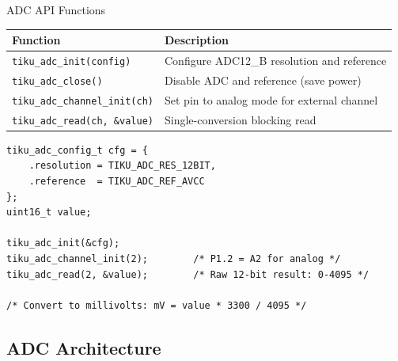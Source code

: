 \documentclass[aspectratio=169, 10pt]{beamer}
\begin{document}
\begin{frame}[fragile]{ADC API Functions}
\begin{table}
\centering
\small
\begin{tabular}{@{}lp{8cm}@{}}
\toprule
\textbf{Function} & \textbf{Description} \\
\midrule
\texttt{tiku\_adc\_init(config)}         & Configure ADC12\_B resolution and reference \\
\texttt{tiku\_adc\_close()}              & Disable ADC and reference (save power) \\
\midrule
\texttt{tiku\_adc\_channel\_init(ch)}    & Set pin to analog mode for external channel \\
\texttt{tiku\_adc\_read(ch, \&value)}    & Single-conversion blocking read \\
\bottomrule
\end{tabular}
\end{table}

\vspace{0.3em}
\begin{lstlisting}[style=cstyle, title={Reading an analog sensor on A2 (P1.2)}]
tiku_adc_config_t cfg = {
    .resolution = TIKU_ADC_RES_12BIT,
    .reference  = TIKU_ADC_REF_AVCC
};
uint16_t value;

tiku_adc_init(&cfg);
tiku_adc_channel_init(2);        /* P1.2 = A2 for analog */
tiku_adc_read(2, &value);        /* Raw 12-bit result: 0-4095 */

/* Convert to millivolts: mV = value * 3300 / 4095 */
\end{lstlisting}
\end{frame}

\subsection{ADC Architecture}
\end{document}
